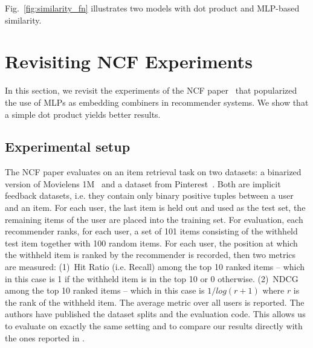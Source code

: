 \documentclass{article}
\begin{document}
Fig.~\ref{fig:similarity_fn} illustrates two models with dot product and MLP-based similarity.


\section{Revisiting NCF Experiments}

In this section, we revisit the experiments of the NCF paper~\cite{he:www17} that popularized the use of MLPs as embedding combiners in recommender systems.
We show that a simple dot product yields better results.

\subsection{Experimental setup}

The NCF paper \cite{he:www17} evaluates on an item retrieval task on two datasets: a binarized version of Movielens 1M~\cite{harper:15} and a dataset from Pinterest~\cite{geng:iccv15}.
Both are implicit feedback datasets, i.e. they contain only binary positive tuples between a user and an item.
For each user, the last item is held out and used as the test set, the remaining items of the user are placed into the training set.
For evaluation, each recommender ranks, for each user, a set of 101 items consisting of the withheld test item together with 100 random items.
For each user, the position at which the withheld item is ranked by the recommender is recorded, then two metrics are measured: (1)~Hit Ratio (i.e. Recall) among the top 10 ranked items -- which in this case is 1 if the withheld item is in the top 10 or 0 otherwise. (2)~NDCG among the top 10 ranked items -- which in this case is $1/log(r+1)$ where $r$ is the rank of the withheld item.
The average metric over all users is reported.
The authors have published the dataset splits and the evaluation code.
This allows us to evaluate on exactly the same setting and to compare our results directly with the ones reported in \cite{he:www17}.
\end{document}
